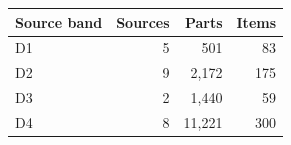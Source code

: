 \begin{tabular}{@{}lrrr@{}}
\toprule
Source band & Sources & Parts & Items\\
\midrule
D1 & 5 & 501 & 83\\
D2 & 9 & 2,172 & 175\\
D3 & 2 & 1,440 & 59\\
D4 & 8 & 11,221 & 300\\
\bottomrule
\end{tabular}
